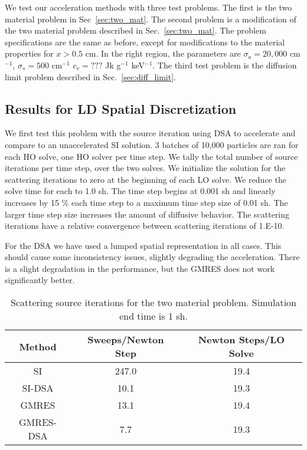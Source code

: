 {We test our acceleration methods with three test problems.  The first is the two material
problem in Sec~\ref{sec:two_mat}.  The second problem is a modification of the two material problem described in
Sec.~\ref{sec:two_mat}. The problem specifications are the same as before, except for
modifications to the material properties for $x>0.5$ cm.  In the right region, the
parameters are $\sigma_a = 20,000$ cm$^{-1}$, $\sigma_s=500 $ cm$^{-1}$ $c_v =??? $ Jk
g$^{-1}$ keV$^{-1}$.  The third test problem is the diffusion limit problem described in
Sec.~\ref{sec:diff_limit}.

\subsection{Results for LD Spatial Discretization}

We first test this problem with the source iteration using DSA to accelerate and compare
to an unaccelerated SI solution.  3 batches of 10,000 particles are ran for each HO
solve, one HO solver per time step.  We tally the total number of source iterations per
time step, over the two solves.  We initialize the solution for the scattering iterations to zero at the beginning of
each LO solve.  We reduce the solve time for each to 1.0 sh.  The time step begins at
0.001 sh and linearly increases by 15 \% each time step to a maximum time step size of
0.01 sh.  The larger time step size increases the amount of diffusive behavior.  The
scattering iterations have a relative convergence between scattering iterations of 1.E-10.

For the DSA we have used a lumped spatial representation in all cases.  This should cause
some inconsistency issues, slightly degrading the acceleration.  There is a slight
degradation in the performance, but the GMRES does not work significantly better.

\begin{table}
    \caption{\label{tab:twomat_dsa_iters} Scattering source iterations for the two
material problem.  Simulation end time is 1 sh.}
    \begin{tabular}{ccc} \hline
        Method & Sweeps/Newton Step & Newton Steps/LO Solve \\ \hline
        SI     & 247.0 & 19.4                \\
        SI-DSA & 10.1   & 19.3      \\
        GMRES  & 13.1    &  19.4     \\
        GMRES-DSA & 7.7  &  19.3  \\ \hline
    \end{tabular}
\end{table}



}
